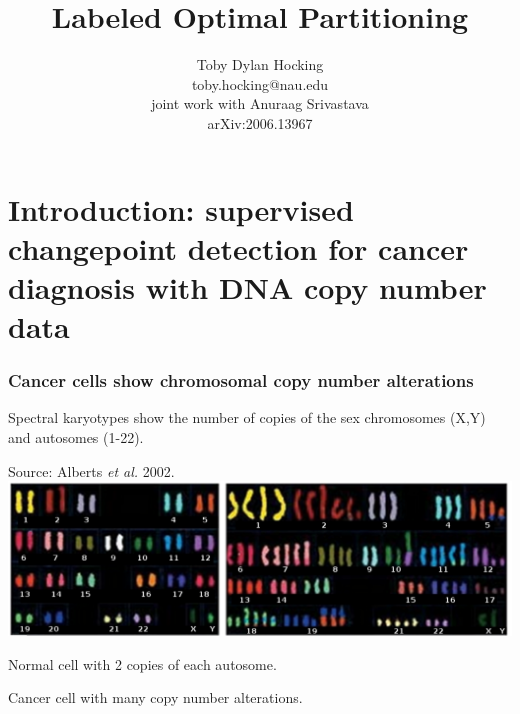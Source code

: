 \documentclass{beamer}
\begin{document}
\title{Labeled Optimal Partitioning}

\author{
  Toby Dylan Hocking\\
  toby.hocking@nau.edu\\
  joint work with Anuraag Srivastava\\
  arXiv:2006.13967
}


\maketitle

\section{Introduction: supervised changepoint detection for cancer diagnosis with DNA copy number data}

\begin{frame}
  \frametitle{Cancer cells show chromosomal copy number alterations}
  Spectral karyotypes show the number of copies of the sex chromosomes
  (X,Y) and autosomes (1-22). 

  Source: Alberts \emph{et al.} 2002.
\vskip 0.1in
  \includegraphics[width=\textwidth]{Karyo-both}
\vskip 0.1in
  \begin{minipage}{0.4\linewidth}
    Normal cell with 2 copies of each autosome.
  \end{minipage}
\linewidth
  \begin{minipage}{0.4\linewidth}
Cancer cell with many copy number alterations.
  \end{minipage}
\end{frame}
\end{document}
